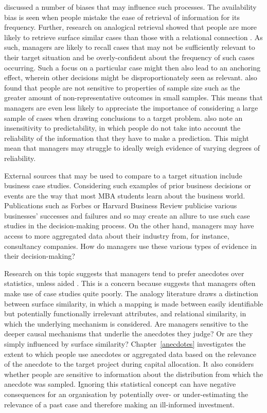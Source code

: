 \documentclass[a4paper, nobind]{templates/ociamthesis}
\theoremstyle{definition}
\theoremstyle{definition}
\theoremstyle{definition}
\theoremstyle{definition}
\theoremstyle{remark}
\begin{document}
\textcite{tversky1974} discussed a number of biases that may influence such processes. The
availability bias is seen when people mistake the ease of retrieval of
information for its frequency. Further, research on analogical retrieval showed
that people are more likely to retrieve surface similar cases than those with a
relational connection \autocite{gentner1993}. As such, managers are likely to recall
cases that may not be sufficiently relevant to their target situation and be
overly-confident about the frequency of such cases occurring. Such a focus on a
particular case might then also lead to an anchoring effect, wherein other
decisions might be disproportionately seen as relevant. \textcite{tversky1974} also found
that people are not sensitive to properties of sample size such as the greater
amount of non-representative outcomes in small samples. This means that managers
are even less likely to appreciate the importance of considering a large sample
of cases when drawing conclusions to a target problem. \textcite{tversky1974} also note an
insensitivity to predictability, in which people do not take into account the
reliability of the information that they have to make a prediction. This might
mean that managers may struggle to ideally weigh evidence of varying degrees of
reliability.

External sources that may be used to compare to a target situation include
business case studies. Considering such examples of prior business decisions or
events are the way that most MBA students learn about the business world.
Publications such as Forbes or Harvard Business Review publicise various
businesses' successes and failures and so may create an allure to use such case
studies in the decision-making process. On the other hand, managers may have
access to more aggregated data about their industry from, for instance,
consultancy companies. How do managers use these various types of evidence in
their decision-making?

Research on this topic suggests that managers tend to prefer anecdotes over
statistics, unless aided \autocite{wainberg2018}. This is a concern because \textcite{gavetti2005}
suggests that managers often make use of case studies quite poorly. The analogy
literature draws a distinction between surface similarity, in which a mapping is
made between easily identifiable but potentially functionally irrelevant
attributes, and relational similarity, in which the underlying mechanism is
considered. Are managers sensitive to the deeper causal mechanisms that underlie
the anecdotes they judge? Or are they simply influenced by surface similarity?
Chapter~\ref{anecdotes} investigates the extent to which people use anecdotes
or aggregated data based on the relevance of the anecdote to the target project
during capital allocation. It also considers whether people are sensitive to
information about the distribution from which the anecdote was sampled. Ignoring
this statistical concept can have negative consequences for an organisation by
potentially over- or under-estimating the relevance of a past case and therefore
making an ill-informed investment.
\end{document}
